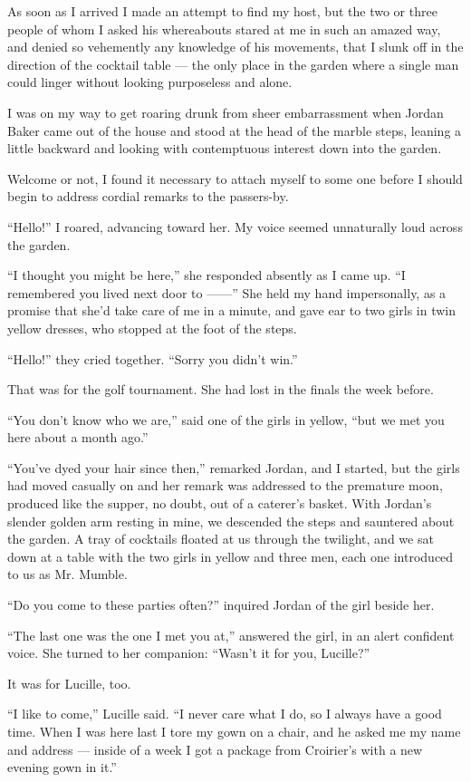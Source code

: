 \documentclass{znotebook}
\begin{document}
As soon as I arrived I made an attempt to find my host, but the two or three people of whom I asked his whereabouts stared at me in such an amazed way, and denied so vehemently any knowledge of his movements, that I slunk off in the direction of the cocktail table — the only place in the garden where a single man could linger without looking purposeless and alone.

I was on my way to get roaring drunk from sheer embarrassment when Jordan Baker came out of the house and stood at the head of the marble steps, leaning a little backward and looking with contemptuous interest down into the garden.

Welcome or not, I found it necessary to attach myself to some one before I should begin to address cordial remarks to the passers-by.

``Hello!'' I roared, advancing toward her. My voice seemed unnaturally loud across the garden.

``I thought you might be here,'' she responded absently as I came up. ``I remembered you lived next door to ——'' She held my hand impersonally, as a promise that she'd take care of me in a minute, and gave ear to two girls in twin yellow dresses, who stopped at the foot of the steps.

``Hello!'' they cried together. ``Sorry you didn't win.''

That was for the golf tournament. She had lost in the finals the week before.

``You don't know who we are,'' said one of the girls in yellow, ``but we met you here about a month ago.''

``You've dyed your hair since then,'' remarked Jordan, and I started, but the girls had moved casually on and her remark was addressed to the premature moon, produced like the supper, no doubt, out of a caterer's basket. With Jordan's slender golden arm resting in mine, we descended the steps and sauntered about the garden. A tray of cocktails floated at us through the twilight, and we sat down at a table with the two girls in yellow and three men, each one introduced to us as Mr. Mumble.

``Do you come to these parties often?'' inquired Jordan of the girl beside her.

``The last one was the one I met you at,'' answered the girl, in an alert confident voice. She turned to her companion: ``Wasn't it for you, Lucille?''

It was for Lucille, too.

``I like to come,'' Lucille said. ``I never care what I do, so I always have a good time. When I was here last I tore my gown on a chair, and he asked me my name and address — inside of a week I got a package from Croirier's with a new evening gown in it.''
\end{document}
